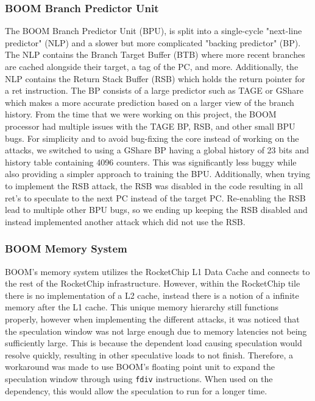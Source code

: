 \subsubsection{BOOM Branch Predictor Unit}

The BOOM Branch Predictor Unit (BPU), is split into a single-cycle "next-line predictor" (NLP) and a
slower but more complicated "backing predictor" (BP). The NLP contains the Branch Target Buffer (BTB) 
where more recent branches are cached alongside their target, a tag of the PC, and more. Additionally,
the NLP contains the Return Stack Buffer (RSB) which holds the return pointer for a ret instruction. The BP
consists of a large predictor such as TAGE or GShare which makes a more accurate prediction based on
a larger view of the branch history. From the time that we were working on this project, the BOOM 
processor had multiple issues with the TAGE BP, RSB, and other small BPU bugs. For simplicity and 
to avoid bug-fixing the core instead of working on the attacks, we switched to using a GShare BP
having a global history of 23 bits and history table containing 4096 counters. This was significantly
less buggy while also providing a simpler approach to training the BPU. Additionally, when trying to
implement the RSB attack, the RSB was disabled in the code resulting in all ret's to speculate to
the next PC instead of the target PC. Re-enabling the RSB lead to multiple other BPU bugs, so we
ending up keeping the RSB disabled and instead implemented another attack which did not use the RSB.

\subsubsection{BOOM Memory System}

BOOM's memory system utilizes the RocketChip L1 Data Cache and connects to the rest of the RocketChip
infrastructure. However, within the RocketChip tile there is no implementation of a L2 cache, instead
there is a notion of a infinite memory after the L1 cache. This unique memory hierarchy still functions
properly, however when implementing the different attacks, it was noticed that the speculation window
was not large enough due to memory latencies not being sufficiently large. This is because the
dependent load causing speculation would resolve quickly, resulting in other speculative loads to not
finish. Therefore, a workaround was made to use BOOM's floating point unit to expand the speculation 
window through using {\tt fdiv} instructions. When used on the dependency, this would allow the speculation
to run for a longer time.


